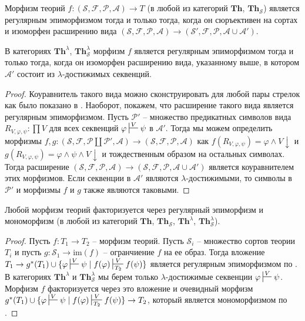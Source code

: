 \documentclass[reqno]{amsart}
\theoremstyle{definition}
\theoremstyle{remark}
\newcommand{\bcat}[1]{\mathbf{#1}}
\newcommand{\fs}[1]{\mathrm{#1}}
\newcommand{\Th}{\bcat{Th}}
\begin{document}
\begin{prop}[th-epi]
Морфизм теорий $f : (\mathcal{S},\mathcal{F},\mathcal{P},\mathcal{A}) \to T$ (в любой из категорий $\Th$, $\Th_\mathcal{S}$) является регулярным эпиморфизмом тогда и только тогда,
когда он сюръективен на сортах и изоморфен расширению вида $(\mathcal{S},\mathcal{F},\mathcal{P},\mathcal{A}) \to (\mathcal{S}',\mathcal{F},\mathcal{P},\mathcal{A} \cup \mathcal{A}')$.

В категориях $\Th^\lambda$, $\Th_\mathcal{S}^\lambda$ морфизм $f$ является регулярным эпиморфизмом тогда и только тогда,
когда он изоморфен расширению вида, указанному выше, в котором $\mathcal{A}'$ состоит из $\lambda$-достижимых секвенций.
\end{prop}
\begin{proof}
Коуравнитель такого вида можно сконструировать для любой пары стрелок как было показано в .
Наоборот, покажем, что расширение такого вида является регулярным эпиморфизмом.
Пусть $\mathcal{P}'$ -- множество предикатных символов вида $R_{V,\varphi,\psi} : \prod V$ для всех секвенций $\varphi \sststile{}{V} \psi$ в $\mathcal{A}'$.
Тогда мы можем определить морфизмы $f,g : (\mathcal{S},\mathcal{F},\mathcal{P} \amalg \mathcal{P}',\mathcal{A}) \to (\mathcal{S},\mathcal{F},\mathcal{P},\mathcal{A})$
как $f(R_{V,\varphi,\psi}) = \varphi \land V\!\downarrow$ и $g(R_{V,\varphi,\psi}) = \varphi \land \psi \land V\!\downarrow$ и тождественным образом на остальных символах.
Тогда расширение $(\mathcal{S},\mathcal{F},\mathcal{P},\mathcal{A}) \to (\mathcal{S},\mathcal{F},\mathcal{P},\mathcal{A} \cup \mathcal{A}')$ является коуравнителем этих морфизмов.
Если секвенции в $\mathcal{A}'$ являются $\lambda$-достижимыми, то символы в $\mathcal{P}'$ и морфизмы $f$ и $g$ также являются таковыми.
\end{proof}

\begin{prop}
Любой морфизм теорий факторизуется через регулярный эпиморфизм и мономорфизм (в любой из категорий $\Th$, $\Th_\mathcal{S}$, $\Th^\lambda$, $\Th_\mathcal{S}^\lambda$).
\end{prop}
\begin{proof}
Пусть $f : T_1 \to T_2$ -- морфизм теорий.
Пусть $\mathcal{S}_i$ -- множество сортов теории $T_i$ и пусть $g : \mathcal{S}_1 \to \fs{im}(f)$ -- огранчиение $f$ на ее образ.
Тогда вложение $T_1 \to g^*(T_1) \cup \{ \varphi \sststile{}{V} \psi \mid f(\varphi) \sststile{T_2}{V} f(\psi) \}$ является регулярным эпиморфизмом по .
В категориях $\Th^\lambda$ и $\Th_\mathcal{S}^\lambda$ мы берем только $\lambda$-достижимые секвенции $\varphi \sststile{}{V} \psi$.
Морфизм $f$ факторизуется через это вложение и очевидный морфизм $g^*(T_1) \cup \{ \varphi \sststile{}{V} \psi \mid f(\varphi) \sststile{T_2}{V} f(\psi) \} \to T_2$, который является мономорфизмом по .
\end{proof}
\end{document}
